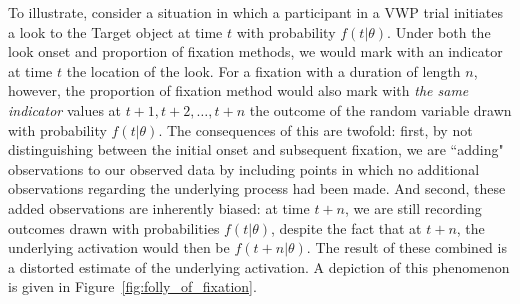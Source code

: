 \documentclass{article}
\begin{document}
To illustrate, consider a situation in which a participant in a VWP trial initiates a look to the Target object at time $t$ with probability $f(t|\theta)$. Under both the look onset and proportion of fixation methods, we would mark with an indicator at time $t$ the location of the look. For a fixation with a duration of length $n$, however, the proportion of fixation method would also mark with \textit{the same indicator} values at $t+1, t+2, \dots, t+n$ the outcome of the random variable drawn with probability $f(t|\theta)$. The consequences of this are twofold: first, by not distinguishing between the initial onset and subsequent fixation, we are ``adding" observations to our observed data by including points in which no additional observations regarding the underlying process had been made. And second, these added observations are inherently biased: at time $t+n$, we are still recording outcomes drawn with probabilities $f(t|\theta)$, despite the fact that at $t+n$, the underlying activation would then be $f(t+n | \theta)$. The result of these combined is a distorted  estimate of the underlying activation. A depiction of this phenomenon is given in Figure~\ref{fig:folly_of_fixation}.
\end{document}
